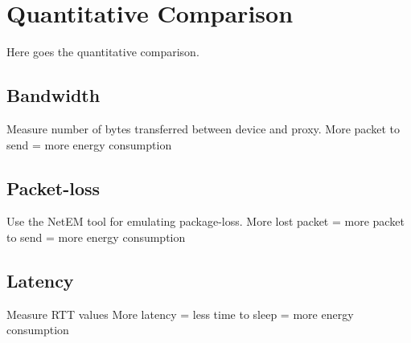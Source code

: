\section{Quantitative Comparison}
Here goes the quantitative comparison.

\subsection{Bandwidth}
Measure number of bytes transferred between device and proxy.
More packet to send = more energy consumption

\subsection{Packet-loss}
Use the NetEM tool for emulating package-loss.
More lost packet = more packet to send = more energy consumption

\subsection{Latency}
Measure RTT values %
More latency = less time to sleep = more energy consumption